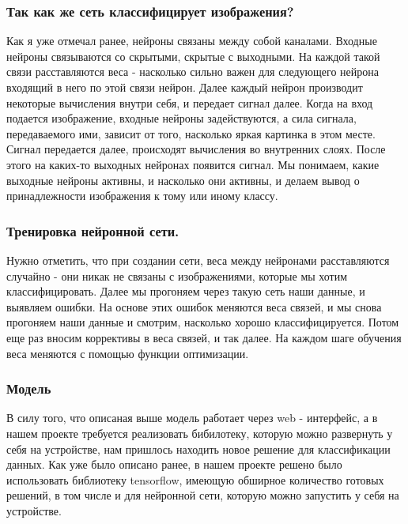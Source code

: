 \subsubsection{Так как же сеть классифицирует изображения?}
Как я уже отмечал ранее, нейроны связаны между собой каналами. 
Входные нейроны связываются со скрытыми, скрытые с выходными. На каждой такой связи расставляются веса - насколько сильно важен для следующего нейрона входящий в него по этой связи нейрон. Далее каждый нейрон производит некоторые вычисления внутри себя, и передает сигнал далее.
Когда на вход подается изображение, входные нейроны задействуются, а сила сигнала, передаваемого ими, зависит от того, насколько яркая картинка в этом месте. Сигнал передается далее, происходят вычисления во внутренних слоях. После этого на каких-то выходных нейронах появится сигнал. Мы понимаем, какие выходные нейроны активны, и насколько они активны, и делаем вывод о принадлежности изображения к тому или иному классу.
\subsubsection{Тренировка нейронной сети.}
Нужно отметить, что при создании сети, веса между нейронами расставляются случайно - они никак не связаны с изображениями, которые мы хотим классифицировать. Далее мы прогоняем через такую сеть наши данные, и выявляем ошибки. На основе этих ошибок меняются веса связей, и мы снова прогоняем наши данные и смотрим, насколько хорошо классифицируется. Потом еще раз вносим коррективы в веса связей, и так далее. На каждом шаге обучения веса меняются с помощью функции оптимизации.


\subsubsection{Модель}

В силу того, что описаная выше модель работает через web - интерфейс, а в нашем проекте требуется реализовать бибилотеку, которую можно развернуть у себя на устройстве, нам пришлось находить новое решение для классификации данных.
Как уже было описано ранее, в нашем проекте решено было использовать библиотеку tensorflow, имеющую обширное количество готовых решений, в том числе и для нейронной сети, которую можно запустить у себя на устройстве.

